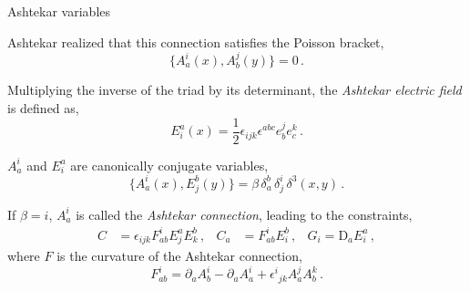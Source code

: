 \documentclass{beamer}
\newcommand\italictext[1]{\textcolor{italics}{\textit{#1}}}
\begin{document}
\begin{frame}{Ashtekar variables}
    \begin{list}{\maltese}{\leftmargin=1em \itemindent=0em}
        \item<1-> Ashtekar realized that this connection satisfies the Poisson bracket,
        \begin{equation}
            \{A_a^i(x),A_b^j(y)\}=0\,.
        \end{equation}
        \item<2-> Multiplying the inverse of the triad by its determinant, the \italictext{Ashtekar electric field} is defined as,
        \begin{equation}
            E^a_i(x)=\frac{1}{2}\epsilon_{ijk}\epsilon^{abc} e_b^j e_c^k\,.
        \end{equation}
        \item<3-> $A_a^i$ and $E^a_i$ are canonically conjugate variables,
        \begin{equation}
            \{A_a^i(x),E^b_j(y)\}=\beta\,\delta_a^b\,\delta_j^i\,\delta^3(x,y)\,.
        \end{equation}
        \item<4-> If $\beta=i$, $A_a^i$ is called the \italictext{Ashtekar connection}, leading to the constraints,
        \begin{align}
            C&=\epsilon_{ijk}F^i_{ab}E^{a}_j E^{b}_k\,, & C_a&=F^i_{ab}E^{b}_i\,, & G_i=\text{D}_{a}E^a_i\,,
        \end{align}
        where $F$ is the curvature of the Ashtekar connection,
        \begin{equation}
            F^i_{ab}=\partial_a A_b^i - \partial_a A_a^i + {\epsilon^i}_{jk} A_a^j A_b^k\,.
        \end{equation}
    \end{list}
\end{frame}
\end{document}
